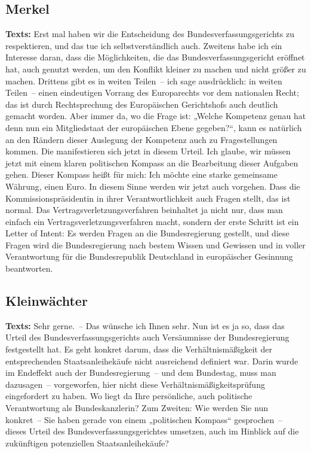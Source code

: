 \documentclass{article}
\begin{document}
\subsection{Merkel}
\noindent\textbf{Texts:} Erst mal haben wir die Entscheidung des Bundesverfassungsgerichts zu respektieren, und das tue ich selbstverständlich auch. Zweitens habe ich ein Interesse daran, dass die Möglichkeiten, die das Bundesverfassungsgericht eröffnet hat, auch genutzt werden, um den Konflikt kleiner zu machen und nicht größer zu machen. Drittens gibt es in weiten Teilen – ich sage ausdrücklich: in weiten Teilen – einen eindeutigen Vorrang des Europarechts vor dem nationalen Recht; das ist durch Rechtsprechung des Europäischen Gerichtshofs auch deutlich gemacht worden. Aber immer da, wo die Frage ist: „Welche Kompetenz genau hat denn nun ein Mitgliedstaat der europäischen Ebene gegeben?“, kann es natürlich an den Rändern dieser Auslegung der Kompetenz auch zu Fragestellungen kommen. Die manifestieren sich jetzt in diesem Urteil. Ich glaube, wir müssen jetzt mit einem klaren politischen Kompass an die Bearbeitung dieser Aufgaben gehen. Dieser Kompass heißt für mich: Ich möchte eine starke gemeinsame Währung, einen Euro. In diesem Sinne werden wir jetzt auch vorgehen. Dass die Kommissionspräsidentin in ihrer Verantwortlichkeit auch Fragen stellt, das ist normal. Das Vertragsverletzungsverfahren beinhaltet ja nicht nur, dass man einfach ein Vertragsverletzungsverfahren macht, sondern der erste Schritt ist ein Letter of Intent: Es werden Fragen an die Bundesregierung gestellt, und diese Fragen wird die Bundesregierung nach bestem Wissen und Gewissen und in voller Verantwortung für die Bundesrepublik Deutschland in europäischer Gesinnung beantworten.

\subsection{Kleinwächter}
\noindent\textbf{Texts:} Sehr gerne. – Das wünsche ich Ihnen sehr. Nun ist es ja so, dass das Urteil des Bundesverfassungsgerichts auch Versäumnisse der Bundesregierung festgestellt hat. Es geht konkret darum, dass die Verhältnismäßigkeit der entsprechenden Staatsanleihekäufe nicht ausreichend definiert war. Darin wurde im Endeffekt auch der Bundesregierung – und dem Bundestag, muss man dazusagen – vorgeworfen, hier nicht diese Verhältnismäßigkeitsprüfung eingefordert zu haben. Wo liegt da Ihre persönliche, auch politische Verantwortung als Bundeskanzlerin? Zum Zweiten: Wie werden Sie nun konkret – Sie haben gerade von einem „politischen Kompass“ gesprochen – dieses Urteil des Bundesverfassungsgerichtes umsetzen, auch im Hinblick auf die zukünftigen potenziellen Staatsanleihekäufe?
\end{document}
